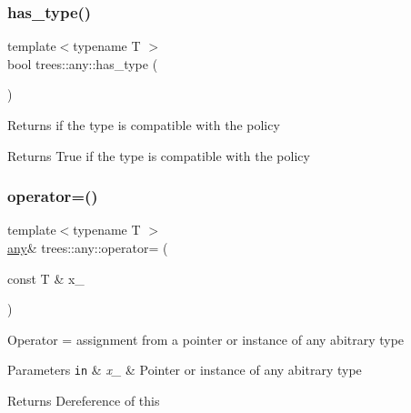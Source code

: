 \subsubsection{\texorpdfstring{has\+\_\+type()}{has\_type()}}
{\footnotesize\ttfamily template$<$typename T $>$ \\
bool trees\+::any\+::has\+\_\+type (\begin{DoxyParamCaption}{ }\end{DoxyParamCaption})\hspace{0.3cm}{\ttfamily [inline]}}

Returns if the type is compatible with the policy

\begin{DoxyReturn}{Returns}
True if the type is compatible with the policy 
\end{DoxyReturn}
\mbox{\label{classtrees_1_1any_a140baa23d88a29f302311907770efdb4}} 
\subsubsection{\texorpdfstring{operator=()}{operator=()}\hspace{0.1cm}{\footnotesize\ttfamily [1/2]}}
{\footnotesize\ttfamily template$<$typename T $>$ \\
\hyperlink{classtrees_1_1any}{any}\& trees\+::any\+::operator= (\begin{DoxyParamCaption}\item[{const T \&}]{x\+\_\+ }\end{DoxyParamCaption})\hspace{0.3cm}{\ttfamily [inline]}}

Operator = assignment from a pointer or instance of any abitrary type


\begin{DoxyParams}[1]{Parameters}
\mbox{\tt in}  & {\em x\+\_\+} & Pointer or instance of any abitrary type \\
\hline
\end{DoxyParams}
\begin{DoxyReturn}{Returns}
Dereference of this 
\end{DoxyReturn}
\mbox{\label{classtrees_1_1any_ad9257bc866836a44234475cba8db09c2}} 
